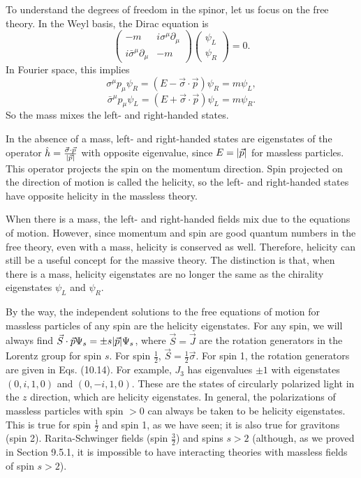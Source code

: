 \documentclass[11pt]{article}
\theoremstyle{definition}
\begin{document}
To understand the degrees of freedom in the spinor, let us focus on the free theory. In the Weyl basis, the Dirac equation is
\begin{equation}
\begin{pmatrix} -m & i\sigma^\mu \partial_\mu \\ i\bar{\sigma}^\mu \partial_\mu & -m \end{pmatrix} \begin{pmatrix} \psi_L \\ \psi_R \end{pmatrix} = 0.
\end{equation}
In Fourier space, this implies
\begin{equation}
\sigma^\mu p_\mu \psi_R = (E - \vec{\sigma} \cdot \vec{p}) \psi_R = m \psi_L,
\end{equation}
\begin{equation}
\bar{\sigma}^\mu p_\mu \psi_L = (E + \vec{\sigma} \cdot \vec{p}) \psi_L = m \psi_R.
\end{equation}
So the mass mixes the left- and right-handed states.

In the absence of a mass, left- and right-handed states are eigenstates of the operator \(\hat{h} = \frac{\vec{\sigma} \cdot \vec{p}}{\abs{\vec{p}}}\) with opposite eigenvalue, since \(E = \abs{\vec{p}}\) for massless particles. This operator projects the spin on the momentum direction. Spin projected on the direction of motion is called the helicity, so the left- and right-handed states have opposite helicity in the massless theory.

When there is a mass, the left- and right-handed fields mix due to the equations of motion. However, since momentum and spin are good quantum numbers in the free theory, even with a mass, helicity is conserved as well. Therefore, helicity can still be a useful concept for the massive theory. The distinction is that, when there is a mass, helicity eigenstates are no longer the same as the chirality eigenstates \(\psi_L\) and \(\psi_R\).

By the way, the independent solutions to the free equations of motion for massless particles of any spin are the helicity eigenstates. For any spin, we will always find \(\vec{S} \cdot \vec{p} \Psi_s = \pm s \abs{\vec{p}} \Psi_s\), where \(\vec{S} = \vec{J}\) are the rotation generators in the Lorentz group for spin \( s \). For spin \(\frac{1}{2}\), \( \vec{S} = \frac{1}{2} \vec{\sigma} \). For spin 1, the rotation generators are given in Eqs. (10.14). For example, \( J_3 \) has eigenvalues \(\pm 1\) with eigenstates $(0,i,1,0)$ and $(0,-i,1,0)$. These are the states of circularly polarized light in the \( z \) direction, which are helicity eigenstates. In general, the polarizations of massless particles with spin \( > 0 \) can always be taken to be helicity eigenstates. This is true for spin \(\frac{1}{2}\) and spin 1, as we have seen; it is also true for gravitons (spin 2). Rarita-Schwinger fields (spin \(\frac{3}{2}\)) and spins \( s > 2 \) (although, as we proved in Section 9.5.1, it is impossible to have interacting theories with massless fields of spin \( s > 2\)).
\end{document}
